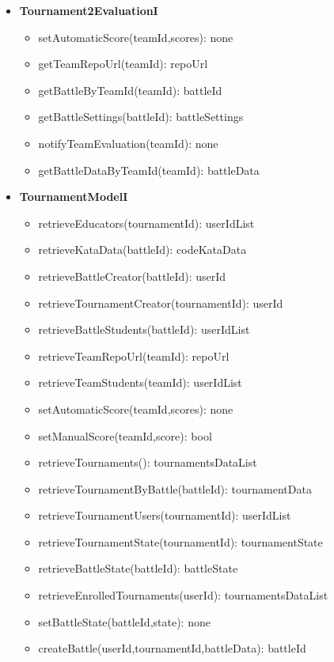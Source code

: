 \begin{itemize}
\begin{itemize}
    \end{itemize}
    \item \textbf{Tournament2EvaluationI}
    \begin{itemize}
        \item setAutomaticScore(teamId,scores): none
        \item getTeamRepoUrl(teamId): repoUrl
        \item getBattleByTeamId(teamId): battleId
        \item getBattleSettings(battleId): battleSettings
        \item notifyTeamEvaluation(teamId): none
        \item getBattleDataByTeamId(teamId): battleData
    \end{itemize}
    \item \textbf{TournamentModelI}
    \begin{itemize}
        \item retrieveEducators(tournamentId): userIdList
        \item retrieveKataData(battleId): codeKataData
        \item retrieveBattleCreator(battleId): userId
        \item retrieveTournamentCreator(tournamentId): userId
        \item retrieveBattleStudents(battleId): userIdList
        \item retrieveTeamRepoUrl(teamId): repoUrl
        \item retrieveTeamStudents(teamId): userIdList
        \item setAutomaticScore(teamId,scores): none
        \item setManualScore(teamId,score): bool
        \item retrieveTournaments(): tournamentsDataList
        \item retrieveTournamentByBattle(battleId): tournamentData
        \item retrieveTournamentUsers(tournamentId): userIdList
        \item retrieveTournamentState(tournamentId): tournamentState
        \item retrieveBattleState(battleId): battleState
        \item retrieveEnrolledTournaments(userId): tournamentsDataList
        \item setBattleState(battleId,state): none
        \item createBattle(userId,tournamentId,battleData): battleId

\end{itemize}
\end{itemize}
